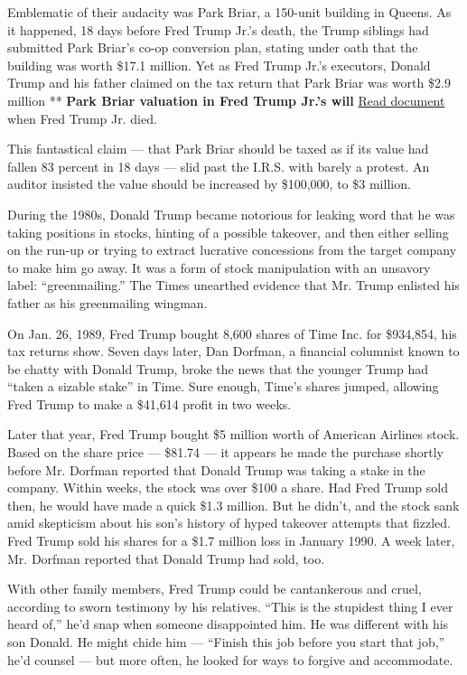 Emblematic of their audacity was Park Briar, a 150-unit building in
Queens. As it happened, 18 days before Fred Trump Jr.'s death, the Trump
siblings had submitted Park Briar's co-op conversion plan, stating under
oath that the building was worth \$17.1 million. Yet as Fred Trump Jr.'s
executors, Donald Trump and his father claimed on the tax return that
Park Briar was worth \$2.9 million ** \textbf{Park Briar valuation in
Fred Trump Jr.'s will}
\href{https://int.graylady3jvrrxbe.onion/data/documenthelper/200-park-briar-valuation-in-ft-jr-/255d1af7ef20e62c9b59/optimized/full.pdf\#page=1}{Read
document} when Fred Trump Jr. died.

This fantastical claim --- that Park Briar should be taxed as if its
value had fallen 83 percent in 18 days --- slid past the I.R.S. with
barely a protest. An auditor insisted the value should be increased by
\$100,000, to \$3 million.

During the 1980s, Donald Trump became notorious for leaking word that he
was taking positions in stocks, hinting of a possible takeover, and then
either selling on the run-up or trying to extract lucrative concessions
from the target company to make him go away. It was a form of stock
manipulation with an unsavory label: ``greenmailing.'' The Times
unearthed evidence that Mr. Trump enlisted his father as his
greenmailing wingman.

On Jan. 26, 1989, Fred Trump bought 8,600 shares of Time Inc. for
\$934,854, his tax returns show. Seven days later, Dan Dorfman, a
financial columnist known to be chatty with Donald Trump, broke the news
that the younger Trump had ``taken a sizable stake'' in Time. Sure
enough, Time's shares jumped, allowing Fred Trump to make a \$41,614
profit in two weeks.

Later that year, Fred Trump bought \$5 million worth of American
Airlines stock. Based on the share price --- \$81.74 --- it appears he
made the purchase shortly before Mr. Dorfman reported that Donald Trump
was taking a stake in the company. Within weeks, the stock was over
\$100 a share. Had Fred Trump sold then, he would have made a quick
\$1.3 million. But he didn't, and the stock sank amid skepticism about
his son's history of hyped takeover attempts that fizzled. Fred Trump
sold his shares for a \$1.7 million loss in January 1990. A week later,
Mr. Dorfman reported that Donald Trump had sold, too.

With other family members, Fred Trump could be cantankerous and cruel,
according to sworn testimony by his relatives. ``This is the stupidest
thing I ever heard of,'' he'd snap when someone disappointed him. He was
different with his son Donald. He might chide him --- ``Finish this job
before you start that job,'' he'd counsel --- but more often, he looked
for ways to forgive and accommodate.

